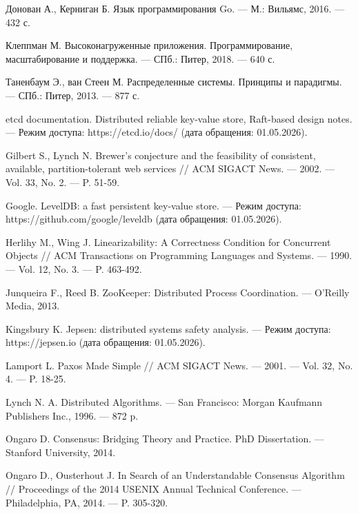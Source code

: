 \begin{biblio}

Донован А., Керниган Б. Язык программирования Go. --- М.: Вильямс, 2016. --- 432 с.

Клеппман М. Высоконагруженные приложения. Программирование, масштабирование и поддержка. --- СПб.: Питер, 2018. --- 640 с.

Таненбаум Э., ван Стеен М. Распределенные системы. Принципы и парадигмы. --- СПб.: Питер, 2013. --- 877 с.

etcd documentation. Distributed reliable key-value store, Raft-based design notes. --- Режим доступа: https://etcd.io/docs/ (дата обращения: 01.05.2026).

Gilbert S., Lynch N. Brewer's conjecture and the feasibility of consistent, available, partition-tolerant web services // ACM SIGACT News. --- 2002. --- Vol. 33, No. 2. --- P. 51-59.

Google. LevelDB: a fast persistent key-value store. --- Режим доступа: https://github.com/google/leveldb (дата обращения: 01.05.2026).

Herlihy M., Wing J. Linearizability: A Correctness Condition for Concurrent Objects // ACM Transactions on Programming Languages and Systems. --- 1990. --- Vol. 12, No. 3. --- P. 463-492.

Junqueira F., Reed B. ZooKeeper: Distributed Process Coordination. --- O'Reilly Media, 2013.

Kingsbury K. Jepsen: distributed systems safety analysis. --- Режим доступа: https://jepsen.io (дата обращения: 01.05.2026).

Lamport L. Paxos Made Simple // ACM SIGACT News. --- 2001. --- Vol. 32, No. 4. --- P. 18-25.

Lynch N. A. Distributed Algorithms. --- San Francisco: Morgan Kaufmann Publishers Inc., 1996. --- 872 p.

Ongaro D. Consensus: Bridging Theory and Practice. PhD Dissertation. --- Stanford University, 2014.

Ongaro D., Ousterhout J. In Search of an Understandable Consensus Algorithm // Proceedings of the 2014 USENIX Annual Technical Conference. --- Philadelphia, PA, 2014. --- P. 305-320.

\end{biblio}
